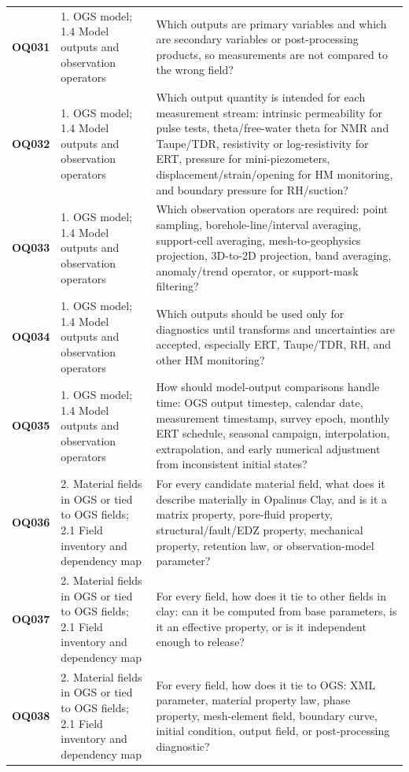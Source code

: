 \begin{longtable}{@{}L{0.10\textwidth} L{0.23\textwidth} L{0.59\textwidth}@{}}
\addlinespace[0.16em]
\textbf{OQ031} & 1. OGS model; 1.4 Model outputs and observation operators & Which outputs are primary variables and which are secondary variables or post-processing products, so measurements are not compared to the wrong field?\\
\addlinespace[0.16em]
\textbf{OQ032} & 1. OGS model; 1.4 Model outputs and observation operators & Which output quantity is intended for each measurement stream: intrinsic permeability for pulse tests, theta/free-water theta for NMR and Taupe/TDR, resistivity or log-resistivity for ERT, pressure for mini-piezometers, displacement/strain/opening for HM monitoring, and boundary pressure for RH/suction?\\
\addlinespace[0.16em]
\textbf{OQ033} & 1. OGS model; 1.4 Model outputs and observation operators & Which observation operators are required: point sampling, borehole-line/interval averaging, support-cell averaging, mesh-to-geophysics projection, 3D-to-2D projection, band averaging, anomaly/trend operator, or support-mask filtering?\\
\addlinespace[0.16em]
\textbf{OQ034} & 1. OGS model; 1.4 Model outputs and observation operators & Which outputs should be used only for diagnostics until transforms and uncertainties are accepted, especially ERT, Taupe/TDR, RH, and other HM monitoring?\\
\addlinespace[0.16em]
\textbf{OQ035} & 1. OGS model; 1.4 Model outputs and observation operators & How should model-output comparisons handle time: OGS output timestep, calendar date, measurement timestamp, survey epoch, monthly ERT schedule, seasonal campaign, interpolation, extrapolation, and early numerical adjustment from inconsistent initial states?\\
\addlinespace[0.16em]
\textbf{OQ036} & 2. Material fields in OGS or tied to OGS fields; 2.1 Field inventory and dependency map & For every candidate material field, what does it describe materially in Opalinus Clay, and is it a matrix property, pore-fluid property, structural/fault/EDZ property, mechanical property, retention law, or observation-model parameter?\\
\addlinespace[0.16em]
\textbf{OQ037} & 2. Material fields in OGS or tied to OGS fields; 2.1 Field inventory and dependency map & For every field, how does it tie to other fields in clay: can it be computed from base parameters, is it an effective property, or is it independent enough to release?\\
\addlinespace[0.16em]
\textbf{OQ038} & 2. Material fields in OGS or tied to OGS fields; 2.1 Field inventory and dependency map & For every field, how does it tie to OGS: XML parameter, material property law, phase property, mesh-element field, boundary curve, initial condition, output field, or post-processing diagnostic?\\

\end{longtable}
